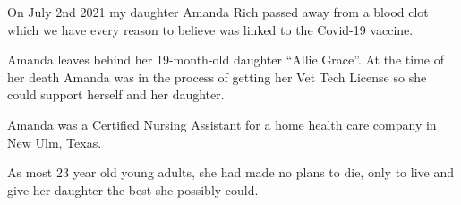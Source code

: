 On July 2nd 2021 my daughter Amanda Rich passed away from a blood clot which we
have every reason to believe was linked to the Covid-19 vaccine.

Amanda leaves behind her 19-month-old daughter “Allie Grace”. At the time of her
death Amanda was in the process of getting her Vet Tech License so she could
support herself and her daughter.

Amanda was a Certified Nursing Assistant for a home health care company in New
Ulm, Texas.

As most 23 year old young adults, she had made no plans to die, only to live and
give her daughter the best she possibly could.

